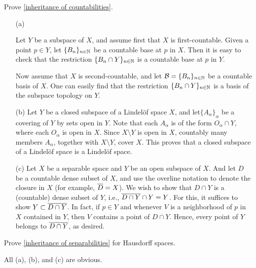 \begin{prob}\label{inheritance: countabilities}
    Prove \cref{inheritance of countabilities}.
\end{prob}
\begin{sol}
    \begin{enumerate}
        \item[(a)]
        {
            Let $Y$ be a subspace of $X$, and assume first that $X$ is first-countable.
            Given a point $p\in Y$, let $\{B_n\}_{n\in{\mathbb{N}}}$ be a countable base at $p$ in $X$.
            Then it is easy to check that the restriction $\{B_n\cap Y\}_{n\in{\mathbb{N}}}$ is a countable base at $p$ in $Y$.

            Now assume that $X$ is second-countable, and let ${\mathcal{B}}=\{B_n\}_{n\in{\mathbb{N}}}$ be a countable basis of $X$.
            One can easily find that the restriction $\{B_n\cap Y\}_{n\in{\mathbb{N}}}$ is a basis of the subspace topology on $Y$.
        }
        \item[(b)]
        {
            Let $Y$ be a closed subspace of a Lindel\"of space $X$, and let$\{A_\alpha\}_\alpha$ be a covering of $Y$ by sets open in $Y$.
            Note that each $A_\alpha$ is of the form $O_\alpha\cap Y$, where each $O_\alpha$ is open in $X$.
            Since $X\setminus Y$ is open in $X$, countably many members $A_\alpha$, together with $X\setminus Y$, cover $X$.
            This proves that a closed subspace of a Lindel\"of space is a Lindel\"of space.
        }
        \item[(c)]
        {
            Let $X$ be a separable space and $Y$ be an open subspace of $X$.
            And let $D$ be a countable dense subset of $X$, and use the overline notation to denote the closure in $X$ (for example, $\overline{D}=X$).
            We wish to show that $D\cap Y$ is a (countable) dense subset of $Y$, i.e., $\overline{D\cap Y}\cap Y=Y$.
            For this, it suffices to show $Y\subset\overline{D\cap Y}$.
            In fact, if $p\in Y$ and whenever $V$ is a neighborhood of $p$ in $X$ contained in $Y$, then $V$ contains a point of $D\cap Y$.
            Hence, every point of $Y$ belongs to $\overline{D\cap Y}$, as desired.
        }
    \end{enumerate}
\end{sol}

\begin{prob}\label{inheritance: Hausdorff}
    Prove \cref{inheritance of separabilities} for Hausdorff spaces.
\end{prob}
\begin{sol}
    All (a), (b), and (c) are obvious.
\end{sol}

